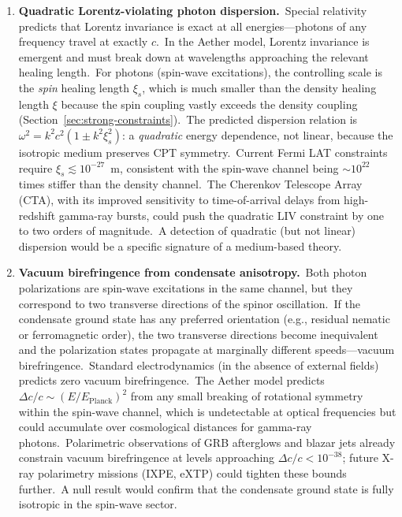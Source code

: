 ﻿\documentclass[12pt,letterpaper]{article}
\begin{document}
\begin{enumerate}[leftmargin=2em]
  \item \textbf{Quadratic Lorentz-violating photon dispersion.}\
    Special relativity predicts that Lorentz invariance is exact at all
    energies---photons of any frequency travel at exactly $c$.\ In the Aether
    model, Lorentz invariance is emergent and must break down at wavelengths
    approaching the relevant healing length.\ For photons (spin-wave
    excitations), the controlling scale is the \emph{spin} healing length
    $\xi_s$, which is much smaller than the density healing length $\xi$
    because the spin coupling vastly exceeds the density coupling
    (Section~\ref{sec:strong-constraints}).\ The predicted dispersion
    relation is $\omega^2 = k^2 c^2 (1 \pm k^2 \xi_s^2)$: a
    \emph{quadratic} energy dependence, not linear, because the isotropic
    medium preserves CPT symmetry.\ Current Fermi LAT constraints require
    $\xi_s \lesssim 10^{-27}$~m, consistent with the spin-wave channel
    being $\sim\!10^{22}$ times stiffer than the density channel.\
    The Cherenkov Telescope Array (CTA), with its improved sensitivity to
    time-of-arrival delays from high-redshift gamma-ray bursts, could push
    the quadratic LIV constraint by one to two orders of magnitude.\ A
    detection of quadratic (but not linear) dispersion would be a specific
    signature of a medium-based theory.

  \item \textbf{Vacuum birefringence from condensate anisotropy.}\
    Both photon polarizations are spin-wave excitations in the same
    channel, but they correspond to two transverse directions of the
    spinor oscillation.\ If the condensate ground state has any
    preferred orientation (e.g., residual nematic or ferromagnetic
    order), the two transverse directions become inequivalent and the
    polarization states propagate at marginally different speeds---vacuum
    birefringence.\ Standard electrodynamics (in the absence of external
    fields) predicts zero vacuum birefringence.\ The Aether model predicts
    $\Delta c / c \sim (E / E_{\mathrm{Planck}})^2$ from any small
    breaking of rotational symmetry within the spin-wave channel, which is
    undetectable at optical frequencies but could accumulate over cosmological
    distances for gamma-ray photons.\ Polarimetric observations of GRB
    afterglows and blazar jets already constrain vacuum birefringence at levels
    approaching $\Delta c / c < 10^{-38}$; future X-ray polarimetry missions
    (IXPE, eXTP) could tighten these bounds further.\ A null result would
    confirm that the condensate ground state is fully isotropic in the
    spin-wave sector.

\end{enumerate}
\end{document}
